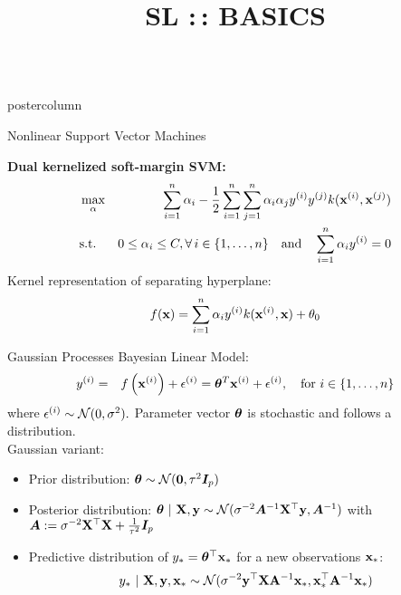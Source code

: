 \documentclass{beamer}
\title{SL :\,: BASICS} %
\newlength{\columnheight} %
\begin{document}
\begin{frame}[fragile]{}
\vspace{-8ex}
\begin{columns}
	\begin{column}{.31\textwidth}
		\begin{beamercolorbox}[center]{postercolumn}
			\begin{minipage}{.98\textwidth}
				\parbox[t][\columnheight]{\textwidth}{
\begin{myblock}{Nonlinear Support Vector Machines}
%	
%	
	
	\textbf{Dual kernelized soft-margin SVM:}
%	
		\begin{eqnarray*}
			& \max_{\alpha} & \sum_{i=1}^n \alpha_i - \frac{1}{2}\sum_{i=1}^n\sum_{j=1}^n\alpha_i\alpha_jy^{(i)} y^{(j)} k(\mathbf{x}^{(i)}, \mathbf{x}^{(j)})  \\
			& \text{s.t. } & 0 \le \alpha_i \le C, \forall\, i \in \{1, \ldots, n\} \quad \text{and} \quad  \sum_{i=1}^n \alpha_i y^{(i)} = 0
		\end{eqnarray*}	
%	
	Kernel representation of separating hyperplane:
%
		$$ f(\mathbf{x}) = \sum\limits_{i=1}^n \alpha_i y^{(i)} k(\mathbf{x}^{(i)}, \mathbf{x})  + \theta_0$$
%
\end{myblock}
%
%   
\begin{myblock}{Gaussian Processes}
%
	Bayesian Linear Model:
%
	\begin{eqnarray*}
		y^{(i)} &=& f\left(\mathbf{x}^{(i)}\right) + \epsilon^{(i)} = \bm{\theta}^T \mathbf{x}^{(i)} + \epsilon^{(i)}, \quad \text{for } i \in \{1, \ldots, n\}
	\end{eqnarray*}
	where $\epsilon^{(i)} \sim \mathcal{N}(0, \sigma^2).$
%
	Parameter vector $\bm{\theta}$ is stochastic and follows a distribution.\\
%	
	
	Gaussian variant: 
%	
	\begin{itemize}
		\setlength{\itemindent}{+.3in}
		\item Prior distribution: $\bm{\theta} \sim \mathcal{N}(\mathbf{0}, \tau^2 \boldsymbol{I}_p)$ 
		\item Posterior distribution:	$
		\bm{\theta} ~|~ \mathbf{X}, \mathbf{y} \sim \mathcal{N}(\sigma^{-2}\bm{A}^{-1}\mathbf{X}^\top\mathbf{y}, \bm{A}^{-1})
		$ with $\bm{A}:= \sigma^{-2}\mathbf{X}^\top\mathbf{X} + \frac{1}{\tau^2} \boldsymbol{I}_p$
		\item Predictive distribution of $y_* = 	\bm{\theta}^\top \mathbf{x}_*$ for a new observations $\mathbf{x}_*$: 
		$$
		y_* ~|~ \mathbf{X}, \mathbf{y}, \mathbf{x}_* \sim \mathcal{N}(\sigma^{-2}\mathbf{y}^\top \mathbf{X} \mathbf{A}^{-1}\mathbf{x}_*, \mathbf{x}_*^\top\mathbf{A}^{-1}\mathbf{x}_*)
		$$
	\end{itemize}


\end{myblock}}
\end{minipage}
\end{beamercolorbox}
\end{column}
\end{columns}
\end{frame}
\end{document}
